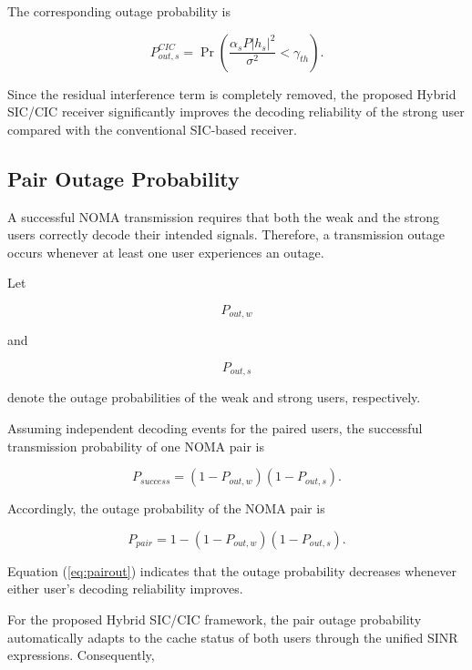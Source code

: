 \documentclass[conference]{IEEEtran}
\begin{document}
The corresponding outage probability is

\begin{equation}
P_{out,s}^{CIC}
=
\Pr
\left(
\frac{\alpha_sP|h_s|^2}
{\sigma^2}
<
\gamma_{th}
\right).
\end{equation}

Since the residual interference term is completely removed, the proposed Hybrid SIC/CIC receiver significantly improves the decoding reliability of the strong user compared with the conventional SIC-based receiver.

\subsection{Pair Outage Probability}

A successful NOMA transmission requires that both the weak and the strong users correctly decode their intended signals. Therefore, a transmission outage occurs whenever at least one user experiences an outage.

Let

\begin{equation}
P_{out,w}
\end{equation}

and

\begin{equation}
P_{out,s}
\end{equation}

denote the outage probabilities of the weak and strong users, respectively.

Assuming independent decoding events for the paired users, the successful transmission probability of one NOMA pair is

\begin{equation}
P_{success}
=
(1-P_{out,w})
(1-P_{out,s}).
\end{equation}

Accordingly, the outage probability of the NOMA pair is

\begin{equation}
P_{pair}
=
1-
(1-P_{out,w})
(1-P_{out,s}).
\label{eq:pairout}
\end{equation}

Equation (\ref{eq:pairout}) indicates that the outage probability decreases whenever either user's decoding reliability improves.

For the proposed Hybrid SIC/CIC framework, the pair outage probability automatically adapts to the cache status of both users through the unified SINR expressions. Consequently,
\end{document}
